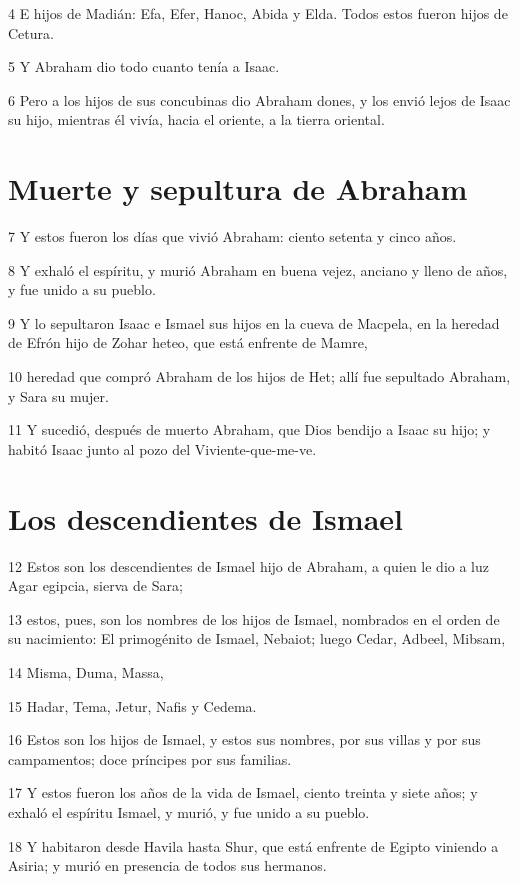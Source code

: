 4 E hijos de Madián: Efa, Efer, Hanoc, Abida y Elda. Todos estos fueron hijos de Cetura.

5 Y Abraham dio todo cuanto tenía a Isaac.

6 Pero a los hijos de sus concubinas dio Abraham dones, y los envió lejos de Isaac su hijo, mientras él vivía, hacia el oriente, a la tierra oriental.

\section{Muerte y sepultura de Abraham}

7 Y estos fueron los días que vivió Abraham: ciento setenta y cinco años.

8 Y exhaló el espíritu, y murió Abraham en buena vejez, anciano y lleno de años, y fue unido a su pueblo.

9 Y lo sepultaron Isaac e Ismael sus hijos en la cueva de Macpela, en la heredad de Efrón hijo de Zohar heteo, que está enfrente de Mamre,

10 heredad que compró Abraham de los hijos de Het; allí fue sepultado Abraham, y Sara su mujer.

11 Y sucedió, después de muerto Abraham, que Dios bendijo a Isaac su hijo; y habitó Isaac junto al pozo del Viviente-que-me-ve.

\section{Los descendientes de Ismael}

12 Estos son los descendientes de Ismael hijo de Abraham, a quien le dio a luz Agar egipcia, sierva de Sara;

13 estos, pues, son los nombres de los hijos de Ismael, nombrados en el orden de su nacimiento: El primogénito de Ismael, Nebaiot; luego Cedar, Adbeel, Mibsam,

14 Misma, Duma, Massa,

15 Hadar, Tema, Jetur, Nafis y Cedema.

16 Estos son los hijos de Ismael, y estos sus nombres, por sus villas y por sus campamentos; doce príncipes por sus familias.

17 Y estos fueron los años de la vida de Ismael, ciento treinta y siete años; y exhaló el espíritu Ismael, y murió, y fue unido a su pueblo.

18 Y habitaron desde Havila hasta Shur, que está enfrente de Egipto viniendo a Asiria; y murió en presencia de todos sus hermanos.

